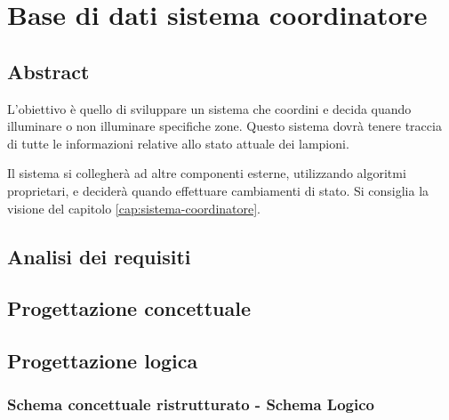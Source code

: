 \section{Base di dati sistema coordinatore}

\subsection{Abstract}

L'obiettivo è quello di sviluppare un sistema che coordini e decida quando illuminare o non illuminare specifiche zone. Questo sistema dovrà tenere traccia di tutte le informazioni relative allo stato attuale dei lampioni.

Il sistema si collegherà ad altre componenti esterne, utilizzando algoritmi proprietari, e deciderà quando effettuare cambiamenti di stato. Si consiglia la visione del capitolo \ref{cap:sistema-coordinatore}.


\subsection{Analisi dei requisiti}

\subsection{Progettazione concettuale}

\subsection{Progettazione logica}

\subsubsection{Schema concettuale ristrutturato - Schema Logico}

